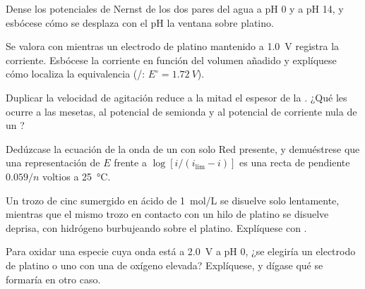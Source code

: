 \begin{exercise}[$\star\star$]\label{exo:b2:current-potential-curves:7}
Dense los potenciales de Nernst de los dos pares del agua a pH 0 y a pH 14, y
esbócese cómo se desplaza con el pH la ventana sobre platino.
\end{exercise}

\begin{exercise}[$\star\star$]\label{exo:b2:current-potential-curves:8}
Se valora  con  mientras un electrodo de platino mantenido a
\qty{1.0}{V} registra la corriente. Esbócese la corriente en función del volumen añadido
y explíquese cómo localiza la equivalencia (/: $E^\circ =
\qty{1.72}{V}$).
\end{exercise}

\begin{exercise}[$\star\star$]\label{exo:b2:current-potential-curves:9}
Duplicar la velocidad de agitación reduce a la mitad el espesor de la . ¿Qué
les ocurre a las mesetas, al potencial de semionda y al potencial de corriente
nula de un ?
\end{exercise}

\begin{exercise}[$\star\star\star$]\label{exo:b2:current-potential-curves:10}
Dedúzcase la ecuación de la onda de un  con solo Red presente, y
demuéstrese que una representación de $E$ frente a $\log[i/(i_{\lim} - i)]$ es una recta de
pendiente $0.059/n$ voltios a \qty{25}{\degreeCelsius}.
\end{exercise}

\begin{exercise}[$\star\star\star$]\label{exo:b2:current-potential-curves:11}
Un trozo de cinc sumergido en ácido de \qty{1}{mol/L} se disuelve solo lentamente, mientras que
el mismo trozo en contacto con un hilo de platino se disuelve deprisa, con hidrógeno burbujeando
sobre el platino. Explíquese con .
\end{exercise}

\begin{exercise}[$\star\star\star$]\label{exo:b2:current-potential-curves:12}
Para oxidar una especie cuya onda está a \qty{2.0}{V} a pH 0, ¿se elegiría un
electrodo de platino o uno con una  de oxígeno elevada? Explíquese, y dígase
qué se formaría en otro caso.
\end{exercise}

